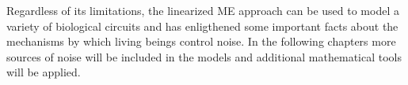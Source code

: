 
Regardless of its limitations, the linearized ME approach can be used to model a variety of biological circuits and has enligthened some important facts about the mechanisms by which living beings control noise. In the following chapters more sources of noise will be included in the models and additional mathematical tools will be applied.

